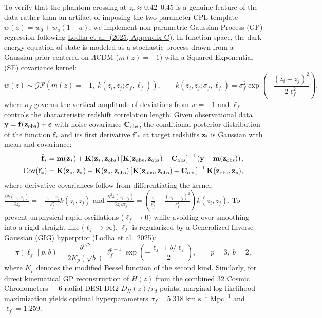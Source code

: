 \documentclass[11pt,letterpaper]{article}
\begin{document}
To verify that the phantom crossing at $z_c \approx 0.42\text{--}0.45$ is a genuine feature of the data rather than an artifact of imposing the two-parameter CPL template $w(a) = w_0 + w_a(1-a)$, we implement non-parametric Gaussian Process (GP) regression following \href{https://arxiv.org/abs/2503.14743}{Lodha et al.\ (2025, Appendix C)}. In function space, the dark energy equation of state is modeled as a stochastic process drawn from a Gaussian prior centered on $\Lambda$CDM ($m(z) = -1$) with a Squared-Exponential (SE) covariance kernel:
\begin{equation}
    w(z) \sim \mathcal{GP}\!\left( m(z) = -1,\; k(z_i, z_j; \sigma_f, \ell_f) \right), \qquad k(z_i, z_j; \sigma_f, \ell_f) = \sigma_f^2 \exp\!\left( -\frac{(z_i - z_j)^2}{2 \ell_f^2} \right),
    \label{eq:gp_kernel}
\end{equation}
where $\sigma_f$ governs the vertical amplitude of deviations from $w=-1$ and $\ell_f$ controls the characteristic redshift correlation length. Given observational data $\mathbf{y} = \mathbf{f}(\mathbf{z}_{\rm obs}) + \boldsymbol{\epsilon}$ with noise covariance $\mathbf{C}_{\rm obs}$, the conditional posterior distribution of the function $\mathbf{f}_*$ and its first derivative $\mathbf{f}'_*$ at target redshifts $\mathbf{z}_*$ is Gaussian with mean and covariance:
\begin{align}
    \bar{\mathbf{f}}_* &= \mathbf{m}(\mathbf{z}_*) + \mathbf{K}(\mathbf{z}_*, \mathbf{z}_{\rm obs}) \left[ \mathbf{K}(\mathbf{z}_{\rm obs}, \mathbf{z}_{\rm obs}) + \mathbf{C}_{\rm obs} \right]^{-1} \left( \mathbf{y} - \mathbf{m}(\mathbf{z}_{\rm obs}) \right), \label{eq:gp_mean} \\
    \text{Cov}(\mathbf{f}_*) &= \mathbf{K}(\mathbf{z}_*, \mathbf{z}_*) - \mathbf{K}(\mathbf{z}_*, \mathbf{z}_{\rm obs}) \left[ \mathbf{K}(\mathbf{z}_{\rm obs}, \mathbf{z}_{\rm obs}) + \mathbf{C}_{\rm obs} \right]^{-1} \mathbf{K}(\mathbf{z}_{\rm obs}, \mathbf{z}_*), \label{eq:gp_cov}
\end{align}
where derivative covariances follow from differentiating the kernel: $\frac{\partial k(z_i, z_j)}{\partial z_i} = -\frac{z_i - z_j}{\ell_f^2} k(z_i, z_j)$ and $\frac{\partial^2 k(z_i, z_j)}{\partial z_i \partial z_j} = \left(\frac{1}{\ell_f^2} - \frac{(z_i - z_j)^2}{\ell_f^4}\right) k(z_i, z_j)$. To prevent unphysical rapid oscillations ($\ell_f \to 0$) while avoiding over-smoothing into a rigid straight line ($\ell_f \to \infty$), $\ell_f$ is regularized by a Generalized Inverse Gaussian (GIG) hyperprior (\href{https://arxiv.org/abs/2503.14743}{Lodha et al.\ 2025}):
\begin{equation}
    \pi(\ell_f \mid p, b) = \frac{b^{p/2}}{2 K_p(\sqrt{b})}\, \ell_f^{p-1} \exp\!\left( -\frac{\ell_f + b/\ell_f}{2} \right), \qquad p = 3,\; b = 2,
    \label{eq:gig_prior}
\end{equation}
where $K_p$ denotes the modified Bessel function of the second kind. Similarly, for direct kinematical GP reconstruction of $H(z)$ from the combined 32 Cosmic Chronometers + 6 radial DESI DR2 $D_H(z)/r_d$ points, marginal log-likelihood maximization yields optimal hyperparameters $\sigma_f = 5.318\text{ km s}^{-1}\text{ Mpc}^{-1}$ and $\ell_f = 1.259$.
\end{document}
